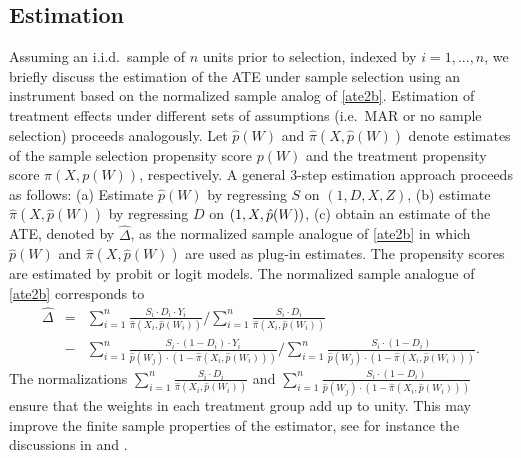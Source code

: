 \documentclass[nojss]{jss}
\begin{document}
\subsection{Estimation}

Assuming an i.i.d.\ sample of $n$ units prior to selection, indexed by $i=1,...,n$, we briefly discuss the estimation of the ATE under sample selection using an instrument based on the normalized sample analog of \eqref{ate2b}. Estimation of treatment effects under different sets of assumptions (i.e.\ MAR or no sample selection) proceeds analogously. Let $\hat{p}(W)$ and $\hat{\pi}(X,\hat{p}(W))$ denote estimates of the sample selection propensity score $p(W)$ and the treatment propensity score $\pi(X,p(W))$, respectively. A general 3-step estimation approach proceeds as follows: \vspace{10 pt}\newline
(a) Estimate $\hat{p}(W)$ by regressing $S$ on $(1,D,X,Z)$,\newline
(b) estimate $\hat{\pi}(X,\hat{p}(W))$ by regressing $D$ on $(1,X,\hat{%
p}(W))$, \newline
(c) obtain an estimate of the ATE, denoted by $\hat{\Delta}$, as the normalized sample analogue of \eqref{ate2b} in which $\hat{p}(W)$ and $\hat{\pi}(X,\hat{p}(W))$ are used as plug-in estimates. \vspace{10 pt}\newline
The propensity scores are estimated by probit or logit models. The normalized sample analogue of \eqref{ate2b} corresponds to
\begin{eqnarray}
\hat{\Delta} &=& \sum_{i=1}^{n}\frac{S_{i}\cdot D_{i}\cdot Y_{i}}{\hat{\pi}(X_{i},\hat{p}(W_{i}))}\bigg/ \sum_{i=1}^{n}\frac{S_{i}\cdot D_{i}}{\hat{\pi}(X_{i},\hat{p}(W_{i}))} \nonumber \\
&-& \sum_{i=1}^{n}\frac{S_{i}\cdot (1-D_{i})\cdot Y_{i}}{\hat{p}(W_{j})\cdot(1-\hat{\pi}(X_{i},\hat{p}(W_{i})))}\bigg/\sum_{i=1}^{n}\frac{S_{i}\cdot (1-D_{i})}{\hat{p}(W_{j})\cdot(1-\hat{\pi}(X_{i},\hat{p}(W_{i})))}.
\end{eqnarray}
The normalizations $\sum_{i=1}^{n}\frac{S_{i}\cdot D_{i}}{\hat{\pi}(X_{i},\hat{p}(W_{i}))}$ and $\sum_{i=1}^{n}\frac{S_{i}\cdot (1-D_{i})}{\hat{p}(W_{j})\cdot(1-\hat{\pi}(X_{i},\hat{p}(W_{i})))}$ ensure that the weights in each treatment group add up to unity. This may improve the finite sample properties of the estimator, see for instance the discussions in \citet{Im04} and \citet{BuDNMC09}.
\end{document}
